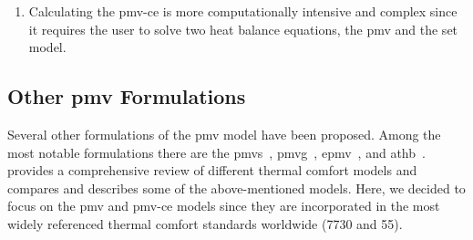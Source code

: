 \begin{enumerate}
    However, while \ac{v}, used to calculate the \ac{pmv-ce}, is set to \qty{0.1}{\m\per\s} the value of \ac{rh} and \ac{clo} are not adjusted to compensate for the fact that \ac{set} fixed the \ac{rh} to \qty{50}{\percent} and standardized the clothing to the activity.
    \item Calculating the \ac{pmv-ce} is more computationally intensive and complex since it requires the user to solve two heat balance equations, the \ac{pmv} and the \ac{set} model.
\end{enumerate}

\subsection{Other \ac{pmv} Formulations}\label{subsec:other-pmv-formulations}
Several other formulations of the \ac{pmv} model have been proposed.
Among the most notable formulations there are the \ac{pmvs}~\cite{GaggeSET}, \ac{pmvg}~\cite{GaggeSET}, \ac{epmv}~\cite{Toftum2002}, and \ac{athb}~\cite{Schweiker2022}.
 provides a comprehensive review of different thermal comfort models and compares and describes some of the above-mentioned models.
Here, we decided to focus on the \ac{pmv} and \ac{pmv-ce} models since they are incorporated in the most widely referenced thermal comfort standards worldwide (\gls{7730} and \gls{55}).

